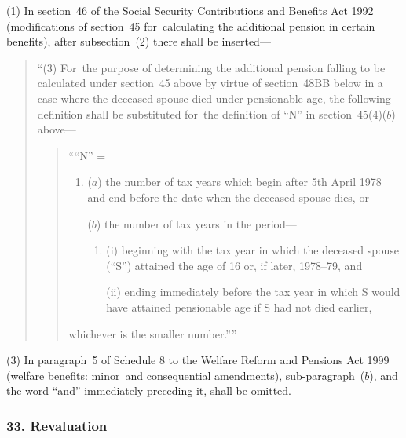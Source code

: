 \documentclass[12pt,a4paper]{article}
\begin{document}
(1) In section~46 of the Social Security Contributions and Benefits Act 1992 (modifications of section~45 for~calculating the additional pension in certain benefits), after subsection~(2)  there shall be inserted—
\begin{quotation}
“(3) For~the purpose of determining the additional pension falling to be calculated under section~45 above by virtue of section~48BB below in a case where the deceased spouse died under pensionable age, the following definition shall be substituted for~the definition of “N” in section~45(4)($b$)  above—
\begin{quotation}
    ““N” =
\begin{enumerate}\item[]
    ($a$) 
    the number of tax years which begin after 5th April 1978 and end before the date when the deceased spouse dies, or

    ($b$) 
    the number of tax years in the period—
\begin{enumerate}\item[]
    (i) 
    beginning with the tax year in which the deceased spouse (“S”) attained the age of 16 or, if later, 1978--79, and

    (ii) 
    ending immediately before the tax year in which S would have attained pensionable age if S had not died earlier,
\end{enumerate}
\end{enumerate}
    whichever is the smaller number.”” 
\end{quotation}
\end{quotation}


(3) In paragraph~5 of Schedule 8 to the Welfare Reform and Pensions Act 1999 (welfare benefits: minor~and consequential amendments), sub-paragraph~($b$), and the word “and” immediately preceding it, shall be omitted.


\subsubsection{33. Revaluation}
\end{document}
